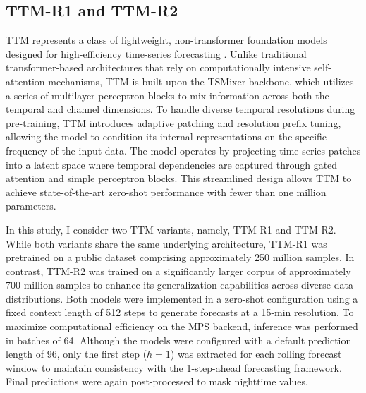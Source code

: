\documentclass[number, 3p, 10pt, times]{elsarticle}
\begin{document}
\subsection{TTM-R1 and TTM-R2}
TTM represents a class of lightweight, non-transformer foundation models designed for high-efficiency time-series forecasting \citep{Ekambaram2024}. Unlike traditional transformer-based architectures that rely on computationally intensive self-attention mechanisms, TTM is built upon the TSMixer backbone, which utilizes a series of multilayer perceptron blocks to mix information across both the temporal and channel dimensions. To handle diverse temporal resolutions during pre-training, TTM introduces adaptive patching and resolution prefix tuning, allowing the model to condition its internal representations on the specific frequency of the input data. The model operates by projecting time-series patches into a latent space where temporal dependencies are captured through gated attention and simple perceptron blocks. This streamlined design allows TTM to achieve state-of-the-art zero-shot performance with fewer than one million parameters.

In this study, I consider two TTM variants, namely, TTM-R1 and TTM-R2. While both variants share the same underlying architecture, TTM-R1 was pretrained on a public dataset comprising approximately 250 million samples. In contrast, TTM-R2 was trained on a significantly larger corpus of approximately 700 million samples to enhance its generalization capabilities across diverse data distributions. Both models were implemented in a zero-shot configuration using a fixed context length of 512 steps to generate forecasts at a 15-min resolution. To maximize computational efficiency on the MPS backend, inference was performed in batches of 64. Although the models were configured with a default prediction length of 96, only the first step ($h=1$) was extracted for each rolling forecast window to maintain consistency with the 1-step-ahead forecasting framework. Final predictions were again post-processed to mask nighttime values.
\end{document}
